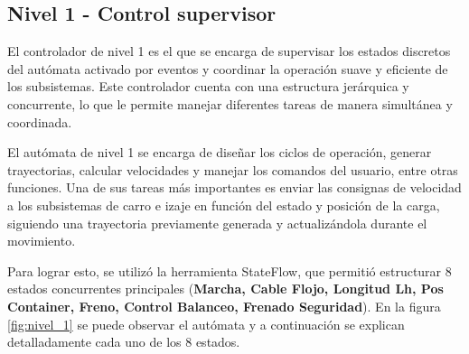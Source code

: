 \documentclass[11pt]{article}
\begin{document}
\newpage
\subsection{Nivel 1 - Control supervisor}

El controlador de nivel 1 es el que se encarga de supervisar los estados discretos del autómata activado por eventos y coordinar la operación suave y eficiente de los subsistemas. Este controlador cuenta con una estructura jerárquica y concurrente, lo que le permite manejar diferentes tareas de manera simultánea y coordinada.

El autómata de nivel 1 se encarga de diseñar los ciclos de operación, generar trayectorias, calcular velocidades y manejar los comandos del usuario, entre otras funciones. Una de sus tareas más importantes es enviar las consignas de velocidad a los subsistemas de carro e izaje en función del estado y posición de la carga, siguiendo una trayectoria previamente generada y actualizándola durante el movimiento.

Para lograr esto, se utilizó la herramienta StateFlow, que permitió estructurar 8 estados concurrentes principales (\textbf{Marcha, Cable Flojo, Longitud Lh, Pos Container, Freno, Control Balanceo, Frenado Seguridad}). En la figura \ref{fig:nivel_1} se puede observar el autómata y a continuación se explican detalladamente cada uno de los 8 estados.
\end{document}
